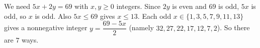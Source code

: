 We need $5x+2y=69$ with $x,y\ge0$ integers. Since $2y$ is even and $69$ is odd, $5x$ is odd, so $x$ is odd. Also $5x\le69$ gives $x\le13$. Each odd $x\in\{1,3,5,7,9,11,13\}$ gives a nonnegative integer $y=\dfrac{69-5x}{2}$ (namely $32,27,22,17,12,7,2$). So there are $\boxed{7}$ ways.
